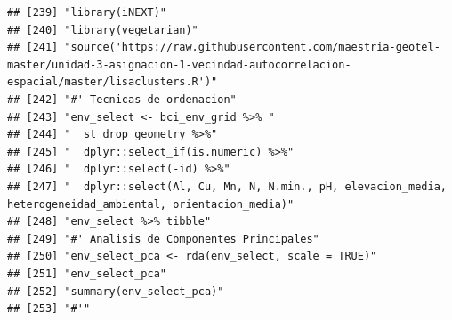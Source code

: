 \documentclass[11pt,]{article}
\begin{document}
\begin{verbatim}
## [239] "library(iNEXT)"                                                                                                                                                        
## [240] "library(vegetarian)"                                                                                                                                                   
## [241] "source('https://raw.githubusercontent.com/maestria-geotel-master/unidad-3-asignacion-1-vecindad-autocorrelacion-espacial/master/lisaclusters.R')"                      
## [242] "#' Tecnicas de ordenacion"                                                                                                                                             
## [243] "env_select <- bci_env_grid %>% "                                                                                                                                       
## [244] "  st_drop_geometry %>%"                                                                                                                                                
## [245] "  dplyr::select_if(is.numeric) %>%"                                                                                                                                    
## [246] "  dplyr::select(-id) %>%"                                                                                                                                              
## [247] "  dplyr::select(Al, Cu, Mn, N, N.min., pH, elevacion_media, heterogeneidad_ambiental, orientacion_media)"                                                              
## [248] "env_select %>% tibble"                                                                                                                                                 
## [249] "#' Analisis de Componentes Principales"                                                                                                                                
## [250] "env_select_pca <- rda(env_select, scale = TRUE)"                                                                                                                       
## [251] "env_select_pca"                                                                                                                                                        
## [252] "summary(env_select_pca)"                                                                                                                                               
## [253] "#'"                                                                                                                                                                    

\end{verbatim}
\end{document}
